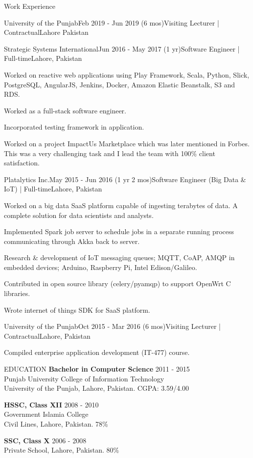\documentclass{resume}
\begin{document}
\begin{rSection}{Work Experience}
\begin{rSubsection}{University of the Punjab}{Feb 2019 - Jun 2019 (6 mos)}{Visiting Lecturer | Contractual}{Lahore Pakistan}
  \end{rSubsection}
  \begin{rSubsection}{Strategic Systems International}{Jun 2016 - May 2017 (1 yr)}{Software Engineer | Full-time}{Lahore, Pakistan}
    \item Worked on reactive web applications using Play Framework, Scala, Python, Slick, PostgreSQL, AngularJS, Jenkins, Docker, Amazon Elastic Beanstalk, S3 and RDS.
    \item Worked as a full-stack software engineer.
    \item Incorporated testing framework in application.
    \item Worked on a project ImpactUs Marketplace which was later mentioned in Forbes. This was a very challenging task and I lead the team with 100\% client satisfaction.
  \end{rSubsection}
  \begin{rSubsection}{Platalytics Inc.}{May 2015 - Jun 2016 (1 yr 2 mos)}{Software Engineer (Big Data \& IoT) | Full-time}{Lahore, Pakistan}
    \item Worked on a big data SaaS platform capable of ingesting terabytes of data. A complete solution for data scientists and analysts.
    \item Implemented Spark job server to schedule jobs in a separate running process communicating through Akka back to server.
    \item Research \& development of IoT messaging queues; MQTT, CoAP, AMQP in embedded devices; Arduino, Raspberry Pi, Intel Edison/Galileo.
    \item Contributed in open source library (celery/pyamqp) to support OpenWrt C libraries.
    \item Wrote internet of things SDK for SaaS platform.
  \end{rSubsection}
  \begin{rSubsection}{University of the Punjab}{Oct 2015 - Mar 2016 (6 mos)}{Visiting Lecturer | Contractual}{Lahore, Pakistan}
    \item Compiled enterprise application development (IT-477) course.
  \end{rSubsection}
\end{rSection}
\begin{rSection}{EDUCATION}
  {\bf Bachelor in Computer Science} \hfill {2011 - 2015}
  \\
  Punjab University College of Information Technology
  \\
  University of the Punjab, Lahore, Pakistan. CGPA: 3.59/4.00

  {\bf HSSC, Class XII} \hfill {2008 - 2010}
  \\
  Government Islamia College
  \\
  Civil Lines, Lahore, Pakistan. 78\%

    {\bf SSC, Class X}  \hfill {2006 - 2008}
  \\
  Private School, Lahore, Pakistan. 80\%

\end{rSection}
\end{document}
